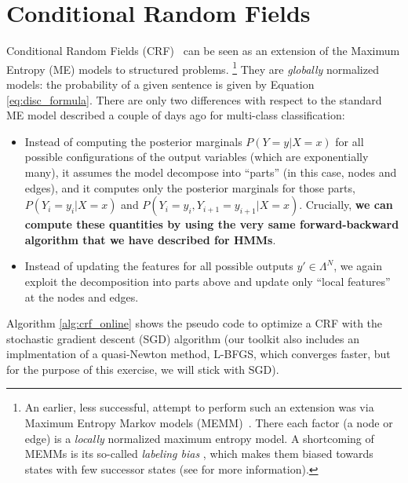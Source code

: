 \section{\label{s:crf}Conditional Random Fields}

Conditional Random Fields (CRF)~\citep{lafferty2001conditional} can be seen
as an extension of the Maximum Entropy (ME) models  to structured problems.%
\footnote{An earlier, less successful, attempt to perform such an extension was via Maximum Entropy Markov
models (MEMM)~\citep{mccallum2000maximum}. There each factor (a node or edge) 
is a \emph{locally} normalized maximum entropy model. A shortcoming of MEMMs is its 
so-called \emph{labeling bias} \citep{Bottou1991}, which makes them biased towards states
with few successor states (see \cite{lafferty2001conditional} for more information).}
They are \emph{globally} normalized models: the probability of a given
sentence is given by Equation \ref{eq:disc_formula}. 
There are only two differences with respect to the standard ME model 
described a couple of days ago for multi-class classification: 
\begin{itemize}
\item Instead of computing the posterior marginals $P(Y=y|X=x)$ for all possible configurations
of the output variables (which are exponentially many), it 
assumes the model decompose into ``parts'' (in this case, nodes and edges), and it computes only 
the posterior marginals for those parts, 
  $P(Y_i=y_i | X=x)$ and  $P(Y_i=y_i, Y_{i+1}=y_{i+1}| X=x)$. 
Crucially, \textbf{we can compute these quantities by using the very same forward-backward algorithm that we have described for HMMs}.
\item Instead of updating the features for all possible outputs $y' \in \Lambda^N$, 
we again exploit the decomposition into parts above and update only 
``local features'' at the nodes and edges.
\end{itemize}

Algorithm
\ref{alg:crf_online} shows the pseudo code to optimize a CRF with 
the stochastic gradient descent (SGD) algorithm  
(our toolkit also includes an implmentation of a quasi-Newton method, L-BFGS, 
which converges faster, but for the purpose of this exercise, we will 
stick with SGD). 

